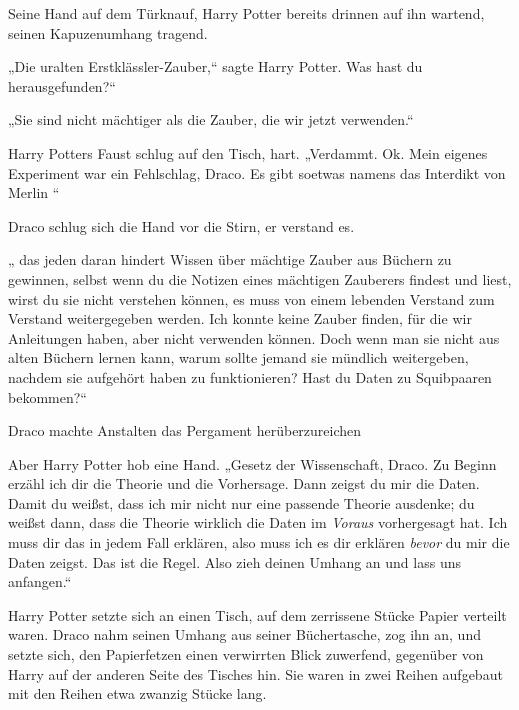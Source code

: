{Seine Hand auf dem Türknauf, Harry Potter bereits drinnen auf ihn wartend, seinen Kapuzenumhang tragend.

„Die uralten Erstklässler-Zauber,“ sagte Harry Potter. Was hast du herausgefunden?“

„Sie sind nicht mächtiger als die Zauber, die wir jetzt verwenden.“

Harry Potters Faust schlug auf den Tisch, hart. „Verdammt. Ok. Mein eigenes Experiment war ein Fehlschlag, Draco. Es gibt soetwas namens das Interdikt von Merlin \later“

Draco schlug sich die Hand vor die Stirn, er verstand es.

„ \later das jeden daran hindert Wissen über mächtige Zauber aus Büchern zu gewinnen, selbst wenn du die Notizen eines mächtigen Zauberers findest und liest, wirst du sie nicht verstehen können, es muss von einem lebenden Verstand zum Verstand weitergegeben werden. Ich konnte keine Zauber finden, für die wir Anleitungen haben, aber nicht verwenden können. Doch wenn man sie nicht aus alten Büchern lernen kann, warum sollte jemand sie mündlich weitergeben, nachdem sie aufgehört haben zu funktionieren? Hast du Daten zu Squibpaaren bekommen?“

Draco machte Anstalten das Pergament herüberzureichen \later

Aber Harry Potter hob eine Hand. „Gesetz der Wissenschaft, Draco. Zu Beginn erzähl ich dir die Theorie und die Vorhersage. Dann zeigst du mir die Daten. Damit du weißst, dass ich mir nicht nur eine passende Theorie ausdenke; du weißst dann, dass die Theorie wirklich die Daten im \emph{Voraus} vorhergesagt hat. Ich muss dir das in jedem Fall erklären, also muss ich es dir erklären \emph{bevor} du mir die Daten zeigst. Das ist die Regel. Also zieh deinen Umhang an und lass uns anfangen.“

Harry Potter setzte sich an einen Tisch, auf dem zerrissene Stücke Papier verteilt waren. Draco nahm seinen Umhang aus seiner Büchertasche, zog ihn an, und setzte sich, den Papierfetzen einen verwirrten Blick zuwerfend, gegenüber von Harry auf der anderen Seite des Tisches hin. Sie waren in zwei Reihen aufgebaut mit den Reihen etwa zwanzig Stücke lang.

}

